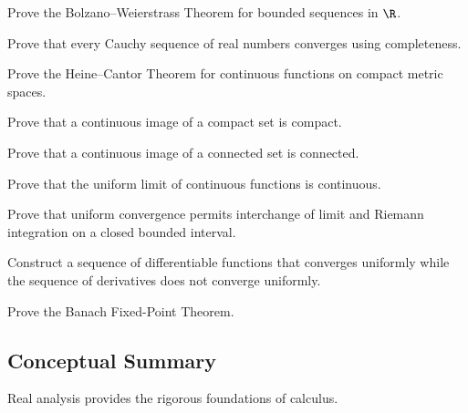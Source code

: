 \begin{exercise}[4]
Prove the Bolzano--Weierstrass Theorem for bounded sequences in \(\R\).
\end{exercise}

\begin{exercise}[4]
Prove that every Cauchy sequence of real numbers converges using
completeness.
\end{exercise}

\begin{exercise}[4]
Prove the Heine--Cantor Theorem for continuous functions on compact metric
spaces.
\end{exercise}

\begin{exercise}[4]
Prove that a continuous image of a compact set is compact.
\end{exercise}

\begin{exercise}[4]
Prove that a continuous image of a connected set is connected.
\end{exercise}

\begin{exercise}[4]
Prove that the uniform limit of continuous functions is continuous.
\end{exercise}

\begin{exercise}[4]
Prove that uniform convergence permits interchange of limit and Riemann
integration on a closed bounded interval.
\end{exercise}

\begin{exercise}[4]
Construct a sequence of differentiable functions that converges uniformly
while the sequence of derivatives does not converge uniformly.
\end{exercise}

\begin{exercise}[4]
Prove the Banach Fixed-Point Theorem.
\end{exercise}

\subsection{Conceptual Summary}
\label{subsec:real-analysis-summary}

Real analysis provides the rigorous foundations of calculus.

